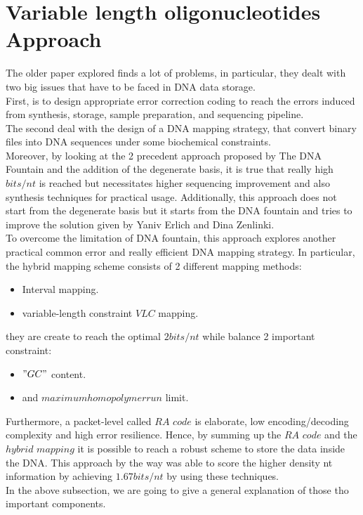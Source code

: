 \documentclass[10pt,twocolumn,twoside]{gsajnl}
\begin{document}
\section {Variable length oligonucleotides Approach}
The older paper explored finds a lot of problems, in particular, they dealt with two big issues that have to be faced in DNA data storage. \\First, is to design appropriate error correction coding to reach the errors induced from synthesis, storage, sample preparation, and sequencing pipeline.\\
The second deal with the design of a DNA mapping strategy, that convert binary files into DNA sequences under some biochemical constraints.\\
Moreover, by looking at the 2 precedent approach proposed by The DNA Fountain and the addition of the degenerate basis, it is true that really high $bits/nt$ is reached but necessitates higher sequencing improvement and also synthesis techniques for practical usage.
Additionally, this approach does not start from the degenerate basis but it starts from the DNA fountain and tries to improve the solution given by Yaniv Erlich and Dina Zenlinki.\\
To overcome the limitation of DNA fountain, this approach explores another practical common error and really efficient DNA mapping strategy. In particular, the hybrid mapping scheme consists of 2 different mapping methods: 
\begin{itemize}
    \item Interval mapping.
    \item variable-length constraint $VLC$ mapping.
\end{itemize}
they are create to reach the optimal $2bits/nt$ while balance 2 important constraint:
\begin{itemize}
    \item $"GC"$ content.
    \item and $maximum homopolymer run$ limit.
\end{itemize}
Furthermore, a packet-level called $RA$ $code$ is elaborate, low encoding/decoding complexity and high error resilience. Hence, by summing up the $RA$ $code$ and the $hybrid$ $ mapping$ it is possible to reach a robust scheme to store the data inside the DNA.
This approach by the way was able to score the higher density nt information by achieving $1.67bits/nt$ by using these techniques.\\
In the above subsection, we are going to give a general explanation of those tho important components.
\end{document}
